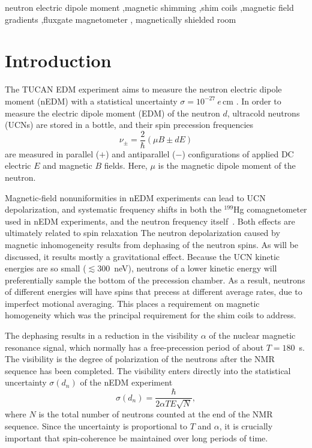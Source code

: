 \documentclass[preprint,12pt]{elsarticle}
\begin{document}
\begin{frontmatter}
\begin{keyword}
neutron electric dipole moment \sep magnetic shimming \sep shim coils
\sep magnetic field gradients \sep fluxgate magnetometer \sep
magnetically shielded room
\end{keyword}

\end{frontmatter}

\section{Introduction}\label{sec1}

The TUCAN EDM experiment aims to measure the neutron electric dipole
moment (nEDM) with a statistical uncertainty
$\sigma=10^{-27}~e\,\mathrm{cm}$ \cite{bib:npn}. In order to measure
the electric dipole moment (EDM) of the neutron $d$, ultracold
neutrons (UCNs) are stored in a bottle, and their spin precession
frequencies
\begin{equation}
\nu_\pm=\frac{2}{\hbar}(\mu B\pm dE)
\end{equation}
are measured in parallel ($+$) and antiparallel ($-$) configurations
of applied DC electric $E$ and magnetic $B$ fields.  Here, $\mu$ is
the magnetic dipole moment of the neutron.

Magnetic-field nonuniformities in nEDM experiments can lead to UCN
depolarization, and systematic frequency shifts in both the $^{199}$Hg
comagnetometer used in nEDM experiments, and the neutron frequency
itself~\cite{pendlebury2015,bib:Abel2019,bib:Abel2020CsMag,bib:Abel2022Mapping}.
Both effects are ultimately related to spin
relaxation\cite{bib:PignolRoccia2012,bib:Pignol2015SpinRelaxation,pendlebury2015}
The neutron depolarization caused by magnetic inhomogeneity results
from dephasing of the neutron spins.  As will be discussed, it results
mostly a gravitational effect.  Because the UCN kinetic energies are
so small ($\lesssim 300$~neV), neutrons of a lower kinetic energy will
preferentially sample the bottom of the precession chamber.  As a
result, neutrons of different energies will have spins that precess at
different average rates, due to imperfect motional averaging.  This
places a requirement on magnetic homogeneity which was the principal
requirement for the shim coils to address.

The dephasing results in a reduction in the visibility $\alpha$ of the
nuclear magnetic resonance signal, which normally has a
free-precession period of about $T=180$~s.  The visibility is the
degree of polarization of the neutrons after the NMR sequence has been
completed.  The visibility enters directly into the statistical
uncertainty $\sigma(d_n)$ of the nEDM experiment
\begin{equation}
\sigma(d_n)=\frac{\hbar}{2\alpha TE\sqrt{N}},
\end{equation}
where $N$ is the total number of neutrons counted at the end of the
NMR sequence.  Since the uncertainty is proportional to $T$ and
$\alpha$, it is crucially important that spin-coherence be maintained
over long periods of time.
\end{document}
